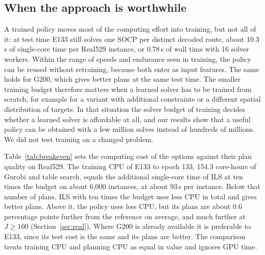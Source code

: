 \documentclass[preprint,12pt,authoryear]{elsarticle}
\begin{document}
\subsection{When the approach is worthwhile}

A trained policy moves most of the computing effort into training, but not all of it: at test time E133 still solves one SOCP per distinct decoded route, about 10.3\,s of single-core time per Real529 instance, or 0.78\,s of wall time with 16 solver workers. Within the range of speeds and endurance seen in training, the policy can be reused without retraining, because both enter as input features. The same holds for G200, which gives better plans at the same test time. The smaller training budget therefore matters when a learned solver has to be trained from scratch, for example for a variant with additional constraints or a different spatial distribution of targets. In that situation the solver budget of training decides whether a learned solver is affordable at all, and our results show that a useful policy can be obtained with a few million solves instead of hundreds of millions. We did not test training on a changed problem.

Table~\ref{tab:breakeven} sets the computing cost of the options against their plan quality on Real529. The training CPU of E133 to epoch 133, 154.3 core-hours of Gurobi and table search, equals the additional single-core time of ILS at ten times the budget on about 6,000 instances, at about 93\,s per instance. Below that number of plans, ILS with ten times the budget uses less CPU in total and gives better plans. Above it, the policy uses less CPU, but its plans are about 0.6 percentage points further from the reference on average, and much further at $J \ge 100$ (Section~\ref{sec:real}). Where G200 is already available it is preferable to E133, since its test cost is the same and its plans are better. The comparison treats training CPU and planning CPU as equal in value and ignores GPU time.

\begin{table}[t]
\centering
\caption{Computing cost and plan quality on Real529. Single-core time per instance for the metaheuristics is the stated multiple of the mean single-core time of E133. Gap is to the reference value of Table~\ref{tab:meta}.}
\label{tab:breakeven}
\small
{}
\end{table}
\end{document}
